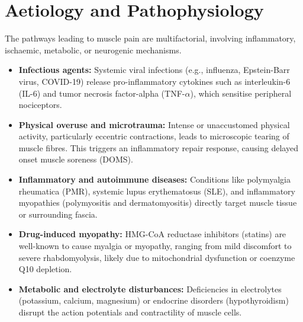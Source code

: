 \section*{Aetiology and Pathophysiology}
The pathways leading to muscle pain are multifactorial, involving inflammatory, ischaemic, metabolic, or neurogenic mechanisms.
\begin{itemize}
    \item \textbf{Infectious agents:} Systemic viral infections (e.g., influenza, Epstein-Barr virus, COVID-19) release pro-inflammatory cytokines such as interleukin-6 (IL-6) and tumor necrosis factor-alpha (TNF-$\alpha$), which sensitise peripheral nociceptors.
    \item \textbf{Physical overuse and microtrauma:} Intense or unaccustomed physical activity, particularly eccentric contractions, leads to microscopic tearing of muscle fibres. This triggers an inflammatory repair response, causing delayed onset muscle soreness (DOMS).
    \item \textbf{Inflammatory and autoimmune diseases:} Conditions like polymyalgia rheumatica (PMR), systemic lupus erythematosus (SLE), and inflammatory myopathies (polymyositis and dermatomyositis) directly target muscle tissue or surrounding fascia.
    \item \textbf{Drug-induced myopathy:} HMG-CoA reductase inhibitors (statins) are well-known to cause myalgia or myopathy, ranging from mild discomfort to severe rhabdomyolysis, likely due to mitochondrial dysfunction or coenzyme Q10 depletion.
    \item \textbf{Metabolic and electrolyte disturbances:} Deficiencies in electrolytes (potassium, calcium, magnesium) or endocrine disorders (hypothyroidism) disrupt the action potentials and contractility of muscle cells.
\end{itemize}

